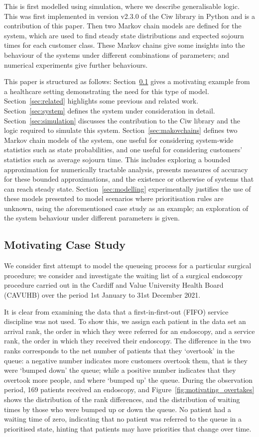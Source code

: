 \documentclass{article}
\begin{document}
This is first modelled using simulation, where we describe generalisable logic.
This was first implemented in version v2.3.0 of the Ciw library in Python
\cite{palmer19} and is a contribution of this paper.
Then two Markov chain models are defined for the system, which are used to find
steady state distributions and expected sojourn times for each customer class.
These Markov chains give some insights into the behaviour of the systems under
different combinations of parameters; and numerical experiments give further
behaviours.

This paper is structured as follows:
Section~\ref{sec:casestudy} gives a motivating example from a healthcare
setting demonstrating the need for this type of model.
Section~\ref{sec:related} highlights some previous and related work.
Section~\ref{sec:system} defines the system under consideration in detail.
Section~\ref{sec:simulation} discusses the contribution to the Ciw library and
the logic required to simulate this system.
Section~\ref{sec:makovchains} defines two Markov chain models of the system, one
useful for considering system-wide statistics such as state probabilities, and
one useful for considering customers' statistics such as average sojourn time.
This includes exploring a bounded approximation for numerically tractable
analysis, presents measures of accuracy for these bounded approximations, and
the existence or otherwise of systems that can reach steady state.
Section~\ref{sec:modelling} experimentally justifies the use of these models
presented to model scenarios where prioritisation rules are unknown, using the
aforementioned case study as an example; an exploration of the system behaviour
under different parameters is given.

\subsection{Motivating Case Study}\label{sec:casestudy}
We consider first attempt to model the queueing process for a particular
surgical procedure; we consider and investigate the waiting list of a surgical
endoscopy procedure carried out in the Cardiff and Value University Health Board
(CAVUHB) over the period 1st January to 31st December 2021.

It is clear from examining the data that a first-in-first-out (FIFO) service
discipline was not used. To show this, we assign each patient in the data set
an arrival rank, the order in which they were referred for an endoscopy, and a
service rank, the order in which they received their endoscopy. The difference
in the two ranks corresponds to the net number of patients that they `overtook'
in the queue: a negative number indicates more customers overtook them, that is
they were `bumped down' the queue; while a positive number indicates that they
overtook more people, and where `bumped up' the queue. During the observation
period, 169 patients received an endoscopy, and
Figure~\ref{fig:motivating_overtakes} shows the distribution of the rank
differences, and the distribution of waiting times by those who were bumped up
or down the queue. No patient had a waiting time of zero, indicating that no
patient was referred to the queue in a prioritised state, hinting that patients
may have priorities that change over time.
\end{document}

